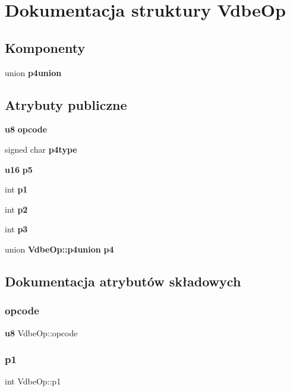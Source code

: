 \section{Dokumentacja struktury Vdbe\+Op}
\label{struct_vdbe_op}
\subsection*{Komponenty}
\begin{DoxyCompactItemize}
\item 
union \textbf{ p4union}
\end{DoxyCompactItemize}
\subsection*{Atrybuty publiczne}
\begin{DoxyCompactItemize}
\item 
\textbf{ u8} \textbf{ opcode}
\item 
signed char \textbf{ p4type}
\item 
\textbf{ u16} \textbf{ p5}
\item 
int \textbf{ p1}
\item 
int \textbf{ p2}
\item 
int \textbf{ p3}
\item 
union \textbf{ Vdbe\+Op\+::p4union} \textbf{ p4}
\end{DoxyCompactItemize}


\subsection{Dokumentacja atrybutów składowych}
\mbox{\label{struct_vdbe_op_ae12a8e7a8f5f7ba39fa379c9ad287837}} 
\subsubsection{opcode}
{\footnotesize\ttfamily \textbf{ u8} Vdbe\+Op\+::opcode}

\mbox{\label{struct_vdbe_op_a17c8326a1e3ac5612d4aaaa88f383b3b}} 
\subsubsection{p1}
{\footnotesize\ttfamily int Vdbe\+Op\+::p1}

\mbox{\label{struct_vdbe_op_aba021fa9d30343c16794d9b76d8bffcd}} 
